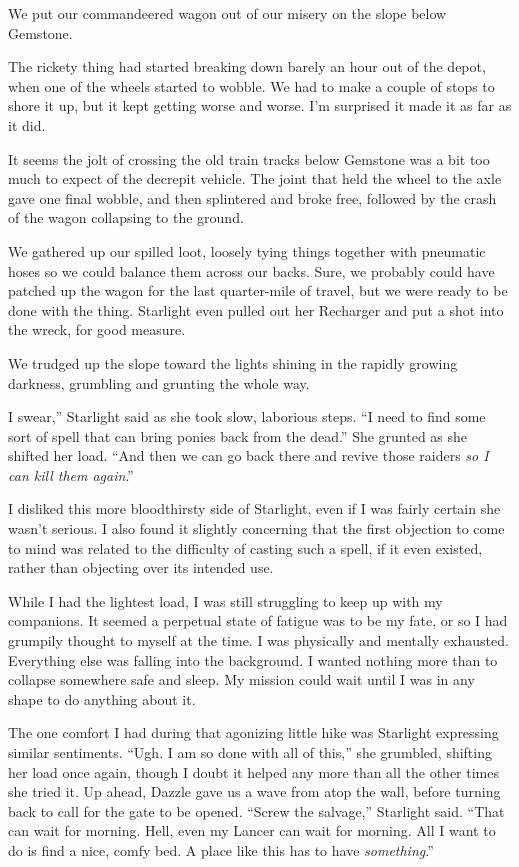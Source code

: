We put our commandeered wagon out of our misery on the slope below Gemstone.

The rickety thing had started breaking down barely an hour out of the depot, when one of the wheels started to wobble. We had to make a couple of stops to shore it up, but it kept getting worse and worse. I’m surprised it made it as far as it did.

It seems the jolt of crossing the old train tracks below Gemstone was a bit too much to expect of the decrepit vehicle. The joint that held the wheel to the axle gave one final wobble, and then splintered and broke free, followed by the crash of the wagon collapsing to the ground.

We gathered up our spilled loot, loosely tying things together with pneumatic hoses so we could balance them across our backs. Sure, we probably could have patched up the wagon for the last quarter-mile of travel, but we were ready to be done with the thing. Starlight even pulled out her Recharger and put a shot into the wreck, for good measure.

We trudged up the slope toward the lights shining in the rapidly growing darkness, grumbling and grunting the whole way.

\leavevmode{}I swear,” Starlight said as she took slow, laborious steps. “I need to find some sort of spell that can bring ponies back from the dead.” She grunted as she shifted her load. “And then we can go back there and revive those raiders \textit{so I can kill them again}.”

I disliked this more bloodthirsty side of Starlight, even if I was fairly certain she wasn’t serious. I also found it slightly concerning that the first objection to come to mind was related to the difficulty of casting such a spell, if it even existed, rather than objecting over its intended use.

While I had the lightest load, I was still struggling to keep up with my companions. It seemed a perpetual state of fatigue was to be my fate, or so I had grumpily thought to myself at the time. I was physically and mentally exhausted. Everything else was falling into the background. I wanted nothing more than to collapse somewhere safe and sleep. My mission could wait until I was in any shape to do anything about it.

The one comfort I had during that agonizing little hike was Starlight expressing similar sentiments. “Ugh. I am so done with all of this,” she grumbled, shifting her load once again, though I doubt it helped any more than all the other times she tried it. Up ahead, Dazzle gave us a wave from atop the wall, before turning back to call for the gate to be opened. “Screw the salvage,” Starlight said. “That can wait for morning. Hell, even my Lancer can wait for morning. All I want to do is find a nice, comfy bed. A place like this has to have \textit{something}.”


